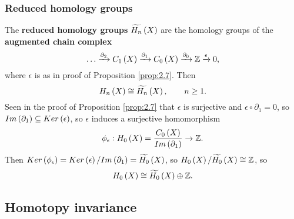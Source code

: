 \subsubsection{Reduced homology groups}

The \textbf{reduced homology groups} $ \widetilde{H_n}\br{X} $ are the homology groups of the \textbf{augmented chain complex}
$$ \dots \xrightarrow{\partial_2} C_1\br{X} \xrightarrow{\partial_1} C_0\br{X} \xrightarrow{\partial_0} \Z \xrightarrow{\epsilon} 0, $$
where $ \epsilon $ is as in proof of Proposition \ref{prop:2.7}. Then
$$ H_n\br{X} \cong \widetilde{H_n}\br{X}, \qquad n \ge 1. $$
Seen in the proof of Proposition \ref{prop:2.7} that $ \epsilon $ is surjective and $ \epsilon \circ \partial_1 = 0 $, so $ Im\br{\partial_1} \subseteq Ker\br{\epsilon} $, so $ \epsilon $ induces a surjective homomorphism
$$ \phi_\epsilon : H_0\br{X} = \dfrac{C_0\br{X}}{Im\br{\partial_1}} \to \Z. $$
Then $ Ker\br{\phi_\epsilon} = Ker\br{\epsilon} / Im\br{\partial_1} = \widetilde{H_0}\br{X} $, so $ H_0\br{X} / \widetilde{H_0}\br{X} \cong \Z $, so
$$ H_0\br{X} \cong \widetilde{H_0}\br{X} \oplus \Z. $$

\pagebreak

\subsection{Homotopy invariance}


